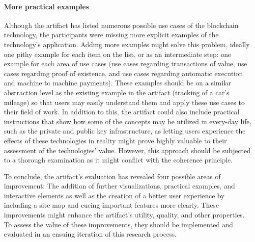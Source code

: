 \paragraph{More practical examples} Although the artifact has listed numerous possible use cases of the blockchain technology, the participants were missing more explicit examples of the technology's application. Adding more examples might solve this problem, ideally one pithy example for each item on the list, or as an intermediate step: one example for each area of use cases (use cases regarding transactions of value, use cases regarding proof of existence, and use cases regarding automatic execution and machine to machine payments). These examples should be on a similar abstraction level as the existing example in the artifact (tracking of a car's mileage) so that users may easily understand them and apply these use cases to their field of work. In addition to this, the artifact could also include practical instructions that show how some of the concepts may be utilized in every-day life, such as the private and public key infrastructure, as letting users experience the effects of these technologies in reality might prove highly valuable to their assessment of the technologies' value. However, this approach should be subjected to a thorough examination as it might conflict with the coherence principle.

To conclude, the artifact's evaluation has revealed four possible areas of improvement: The addition of further visualizations, practical examples, and interactive elements as well as the creation of a better user experience by including a site map and cueing important features more clearly. These improvements might enhance the artifact's utility, quality, and other properties. To assess the value of these improvements, they should be implemented and evaluated in an ensuing iteration of this research process.